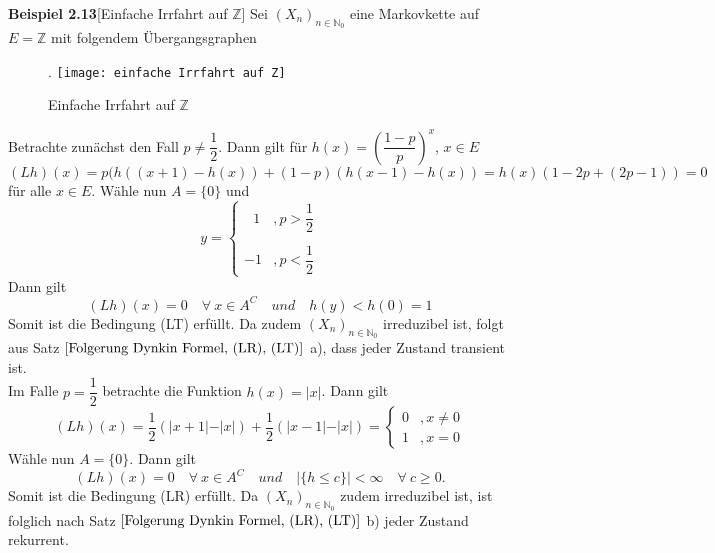 \textbf{Beispiel 2.13}[Einfache Irrfahrt auf $\mathbb{Z}$] Sei $(X_{n})_{n \in \mathbb{N}_{0}}$ eine Markovkette auf $E = \mathbb{Z}$ mit folgendem Übergangsgraphen
\begin{figure}[H].
\centering
\texttt{[image: einfache Irrfahrt auf Z]}
\caption{Einfache Irrfahrt auf $\mathbb{Z}$}
\end{figure}
\noindent
Betrachte zunächst den Fall $p \neq \dfrac{1}{2}$. Dann gilt für $h(x) = {\left(\dfrac{1-p}{p} \right)}^{x}$, $x \in E$
\begin{equation*}
(Lh)(x) = p(h((x+1)-h(x)) + (1-p)(h(x-1)-h(x)) = h(x)(1-2p+(2p-1)) = 0
\end{equation*}
für alle $x \in E$. Wähle nun $A = \lbrace 0 \rbrace$ und 
\begin{equation*}
y =
\begin{cases}
\: \: \:1 & , p > \dfrac{1}{2}\\
& \\
-1 & , p < \dfrac{1}{2}
\end{cases}
\end{equation*}
Dann gilt 
\begin{equation*}
(Lh)(x) = 0 \quad \forall \: x \in A^{C} \quad und \quad h(y) < h(0) = 1
\end{equation*}
Somit ist die Bedingung (LT) erfüllt. Da zudem $(X_{n})_{n \in \mathbb{N}_{0}}$ irreduzibel ist, folgt aus Satz $\ref{Folgerung Dynkin Formel, (LR), (LT)}$ a), dass jeder Zustand transient ist.
\\
Im Falle $p = \dfrac{1}{2}$ betrachte die Funktion $h(x) = \vert x \vert$. Dann gilt
\begin{equation*}
(Lh)(x) = \dfrac{1}{2} (\vert x +1 \vert - \vert x \vert) + \dfrac{1}{2}(\vert x -1 \vert - \vert x \vert) =
\begin{cases}
0 & , x \neq 0\\

1 & , x = 0
\end{cases}
\end{equation*}
Wähle nun $A = \lbrace 0 \rbrace$. Dann gilt
\begin{equation*}
(Lh)(x) = 0 \quad \forall \: x \in A^{C} \quad und \quad \vert \lbrace h \leq c\rbrace \vert < \infty \quad \forall \: c \geq 0.
\end{equation*}
Somit ist die Bedingung (LR) erfüllt. Da $(X_{n})_{n \in \mathbb{N}_{0}}$ zudem irreduzibel ist, ist folglich nach Satz $\ref{Folgerung Dynkin Formel, (LR), (LT)}$ b) jeder Zustand rekurrent.\mbox{}
